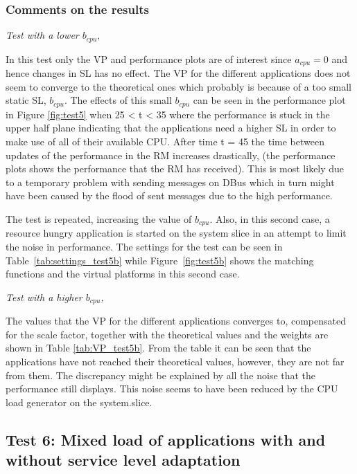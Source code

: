 \documentclass[nobiblatex]{LTHthesis}
\begin{document}
\subsubsection{Comments on the results}

\begin{flushleft}
\emph{Test with a lower $b_{cpu},$}
\end{flushleft}
In this test only the VP and performance plots are of interest since $a_{cpu}=0$ and hence changes in SL has no effect.
The VP for the different applications does not seem to converge to the theoretical ones which probably is because of a too small static SL, $b_{cpu}$.
The effects of this small $b_{cpu}$ can be seen in the performance plot in Figure \ref{fig:test5} when 25 < t < 35 where the performance is stuck in the upper half plane indicating that the applications need a higher SL 
in order to make use of all of their available CPU. After time t = 45 the time between updates of the performance in the RM increases drastically, (the performance plots shows the performance that the RM has received). This is most likely due to a temporary problem with sending messages on DBus which in turn might have been caused by the flood of sent messages due to the high performance.

The test is repeated, increasing the value of $b_{cpu}$. Also, in this
second case, a resource hungry application is started on the system slice 
in an attempt to limit the noise in performance. The settings for the
test can be seen in Table~\ref{tab:settings_test5b} while 
Figure~\ref{fig:test5b} shows the matching functions and the virtual
platforms in this second case.



\begin{flushleft}
\emph{Test with a higher $b_{cpu}$,}
\end{flushleft}
The values that the VP for the different applications converges to, compensated for the scale factor, together with the theoretical values and the weights are shown in Table \ref{tab:VP_test5b}.
From the table it can be seen that the applications have not reached their theoretical values, however, they are not far from them.
The discrepancy might be explained by all the noise that the performance still displays. This noise seems to have been reduced by the CPU load generator on the system.slice.



\subsection{Test 6: Mixed load of applications with and without service 
  level adaptation}
\end{document}
